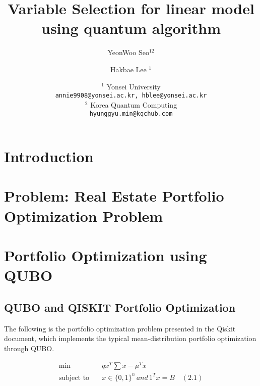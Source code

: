 \documentclass[a4paper]{article}
\title{Variable Selection for linear model using quantum algorithm}
\author{YeonWoo Seo$^{12}$ \and Hakbae Lee $^1$}
\date{
   $^1$ Yonsei University \\ \texttt{annie9908@yonsei.ac.kr, hblee@yonsei.ac.kr}\\%
   $^2$ Korea Quantum Computing \\ \texttt{hyunggyu.min@kqchub.com}
}
\theoremstyle{plain}
\theoremstyle{definition}
\begin{document}
   \maketitle
   
   \begin{abstract}

   \end{abstract}

   \tableofcontents
   
   
\section{Introduction}

\section{Problem: Real Estate Portfolio Optimization Problem}











\clearpage
\section{Portfolio Optimization using QUBO}
\subsection{QUBO and QISKIT Portfolio Optimization} 


The following is the portfolio optimization problem presented in the Qiskit document, which implements the typical mean-distribution portfolio optimization through QUBO. 

\begin{align*}
\min \ \ \, \quad &qx^{T}\displaystyle\sum x - \mu^{T}x \\ 
\text{subject to}\quad &x\in\{0,1\}^n\,and\,1^Tx=B \quad(2.1)
\end{align*}
 
\end{document}
